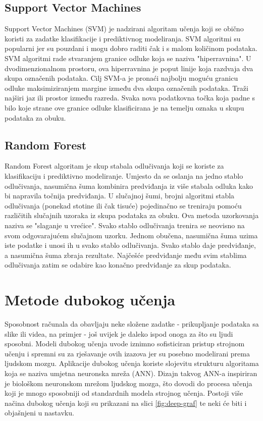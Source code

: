 \documentclass[]{foi}
\begin{document}
\subsection{Support Vector Machines}
Support Vector Machines (SVM) je nadzirani algoritam učenja koji se obično koristi za zadatke klasifikacije i prediktivnog modeliranja. SVM algoritmi su popularni jer su pouzdani i mogu dobro raditi čak i s malom količinom podataka. SVM algoritmi rade stvaranjem granice odluke koja se naziva "hiperravnina". U dvodimenzionalnom prostoru, ova hiperravnina je poput linije koja razdvaja dva skupa označenih podataka. 
Cilj SVM-a je pronaći najbolju moguću granicu odluke maksimiziranjem margine između dva skupa označenih podataka. Traži najširi jaz ili prostor između razreda. Svaka nova podatkovna točka koja padne s bilo koje strane ove granice odluke klasificirana je na temelju oznaka u skupu podataka za obuku. \cite{Coursera2024}

\subsection{Random Forest}
Random Forest algoritam je skup stabala odlučivanja koji se koriste za klasifikaciju i prediktivno modeliranje. Umjesto da se oslanja na jedno stablo odlučivanja, nasumična šuma kombinira predviđanja iz više stabala odluka kako bi napravila točnija predviđanja. U slučajnoj šumi, brojni algoritmi stabla odlučivanja (ponekad stotine ili čak tisuće) pojedinačno se treniraju pomoću različitih slučajnih uzoraka iz skupa podataka za obuku. Ova metoda uzorkovanja naziva se "slaganje u vrećice". Svako stablo odlučivanja trenira se neovisno na svom odgovarajućem slučajnom uzorku. 
Jednom obučena, nasumična šuma uzima iste podatke i unosi ih u svako stablo odlučivanja. Svako stablo daje predviđanje, a nasumična šuma zbraja rezultate. Najčešće predviđanje među svim stablima odlučivanja zatim se odabire kao konačno predviđanje za skup podataka. \cite{Coursera2024}

\section{Metode dubokog učenja}
Sposobnost računala da obavljaju neke složene zadatke - prikupljanje podataka sa slike ili videa, na primjer - još uvijek je daleko ispod onoga za što su ljudi sposobni. Modeli dubokog učenja uvode iznimno sofisticiran pristup strojnom učenju i spremni su za rješavanje ovih izazova jer su posebno modelirani prema ljudskom mozgu. Aplikacije dubokog učenja koriste slojevitu strukturu algoritama koja se naziva umjetna neuronska mreža (ANN). Dizajn takvog ANN-a inspiriran je biološkom neuronskom mrežom ljudskog mozga, što dovodi do procesa učenja koji je mnogo sposobniji od standardnih modela strojnog učenja. \cite{Wolfewicz} Postoji više načina dubokog učenja koji su prikazani na slici \ref{fig:deep-graf} te neki će biti i objašnjeni u nastavku.
\end{document}
